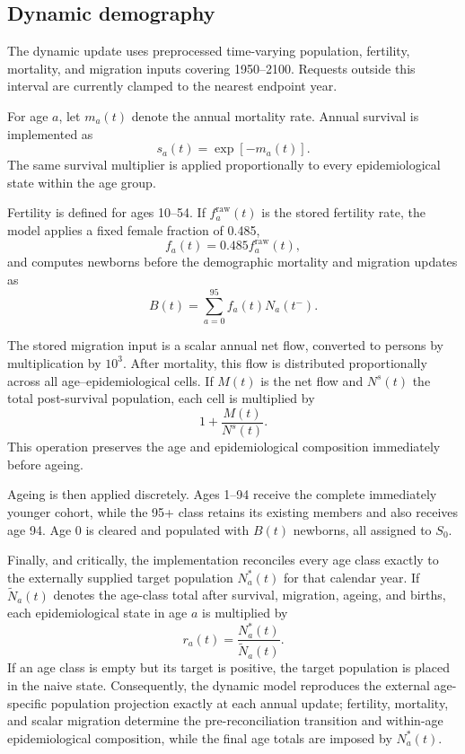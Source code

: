 \documentclass[11pt]{article}
\begin{document}
\subsection{Dynamic demography}

The dynamic update uses preprocessed time-varying population, fertility, mortality, and migration inputs covering 1950--2100. Requests outside this interval are currently clamped to the nearest endpoint year.

For age $a$, let $m_a(t)$ denote the annual mortality rate. Annual survival is implemented as
\begin{equation}
s_a(t)=\exp[-m_a(t)].
\label{eq:demogsurvival}
\end{equation}
The same survival multiplier is applied proportionally to every epidemiological state within the age group.

Fertility is defined for ages 10--54. If $f_a^{\mathrm{raw}}(t)$ is the stored fertility rate, the model applies a fixed female fraction of 0.485,
\begin{equation}
f_a(t)=0.485f_a^{\mathrm{raw}}(t),
\end{equation}
and computes newborns before the demographic mortality and migration updates as
\begin{equation}
B(t)=\sum_{a=0}^{95}f_a(t)N_a(t^-).
\label{eq:births}
\end{equation}

The stored migration input is a scalar annual net flow, converted to persons by multiplication by $10^3$. After mortality, this flow is distributed proportionally across all age--epidemiological cells. If $M(t)$ is the net flow and $N^{s}(t)$ the total post-survival population, each cell is multiplied by
\begin{equation}
1+\frac{M(t)}{N^{s}(t)}.
\label{eq:migration}
\end{equation}
This operation preserves the age and epidemiological composition immediately before ageing.

Ageing is then applied discretely. Ages 1--94 receive the complete immediately younger cohort, while the 95+ class retains its existing members and also receives age 94. Age 0 is cleared and populated with $B(t)$ newborns, all assigned to $S_0$.

Finally, and critically, the implementation reconciles every age class exactly to the externally supplied target population $N_a^*(t)$ for that calendar year. If $\widetilde N_a(t)$ denotes the age-class total after survival, migration, ageing, and births, each epidemiological state in age $a$ is multiplied by
\begin{equation}
r_a(t)=\frac{N_a^*(t)}{\widetilde N_a(t)}.
\label{eq:reconcile}
\end{equation}
If an age class is empty but its target is positive, the target population is placed in the naive state. Consequently, the dynamic model reproduces the external age-specific population projection exactly at each annual update; fertility, mortality, and scalar migration determine the pre-reconciliation transition and within-age epidemiological composition, while the final age totals are imposed by $N_a^*(t)$.
\end{document}
